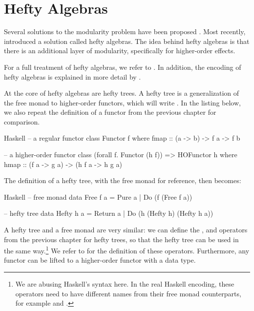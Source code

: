 \section{Hefty Algebras}\label{sec:hefty_algebras}

Several solutions to the modularity problem have been proposed \autocite{wu_effect_2014,oh_latent_2021}. Most recently, \textcite{bach_poulsen_hefty_2023} introduced a solution called hefty algebras. The idea behind hefty algebras is that there is an additional layer of modularity, specifically for higher-order effects.

For a full treatment of hefty algebras, we refer to \textcite{bach_poulsen_hefty_2023}. In addition, the encoding of hefty algebras is explained in more detail by \textcite{bach_poulsen_algebras_2023}.

At the core of hefty algebras are hefty trees. A hefty tree is a generalization of the free monad to higher-order functors, which will write . In the listing below, we also repeat the definition of a functor from the previous chapter for comparison.

\begin{lst}{Haskell}
-- a regular functor
class Functor f where
  fmap :: (a -> b) -> f a -> f b

-- a higher-order functor
class (forall f. Functor (h f)) => HOFunctor h where
  hmap :: (f a -> g a) -> (h f a -> h g a)
\end{lst}
%
The definition of a hefty tree, with the free monad for reference, then becomes:

\begin{lst}{Haskell}
-- free monad
data Free f a
  = Pure a
  | Do (f (Free f a))

-- hefty tree
data Hefty h a
  = Return a
  | Do (h (Hefty h) (Hefty h a))
\end{lst}
%
A hefty tree and a free monad are very similar: we can define the \hs{>>=}, \hs{<} and \hs{+} operators from the previous chapter for hefty trees, so that the hefty tree can be used in the same way.\footnote{We are abusing Haskell's syntax here. In the real Haskell encoding, these operators need to have different names from their free monad counterparts, for example \hs{:+} and \hs{:<}.} We refer to \textcite{bach_poulsen_hefty_2023} for the definition of these operators. Furthermore, any functor can be lifted to a higher-order functor with a  data type.

